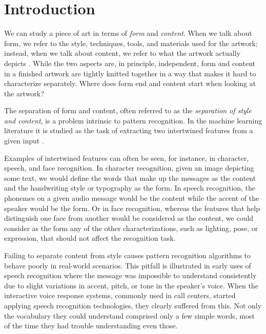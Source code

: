 
\chapter{Introduction}
\label{chap:intro}




We can study a piece of art in terms of \emph{form} and \emph{content}.
When we talk about form, we refer to the style, techniques, tools, and materials used for the artwork; instead, when we talk about content, we refer to what the artwork actually depicts \cite{Esaak}.
While the two aspects are, in principle, independent, form and content in a finished artwork are tightly knitted together in a way that makes it hard to characterize separately.
Where does form end and content start when looking at the artwork? \cite{Xie2007}

The separation of form and content, often referred to as the \emph{separation of style and content}, is a problem intrinsic to pattern recognition.
In the machine learning literature it is studied as the task of extracting two intertwined features from a given input \cite{Tenenbaum2000}.

Examples of intertwined features can often be seen, for instance, in character, speech, and face recognition.
In character recognition, given an image depicting some text, we would define the words that make up the messages as the content and the handwriting style or typography as the form.
In speech recognition, the phonemes on a given audio message would be the content while the accent of the speaker would be the form.
Or in face recognition, whereas the features that help distinguish one face from another would be considered as the content, we could consider as the form any of the other characterizations, such as lighting, pose, or expression, that should not affect the recognition task.

Failing to separate content from style causes pattern recognition algorithms to behave poorly in real-world scenarios.
This pitfall is illustrated in early uses of speech recognition where the message was impossible to understand consistently due to slight variations in accent, pitch, or tone in the speaker's voice.
When the interactive voice response systems, commonly used in call centers, started applying speech recognition technologies, they clearly suffered from this.
Not only the vocabulary they could understand comprised only a few simple words, most of the time they had trouble understanding even those.

